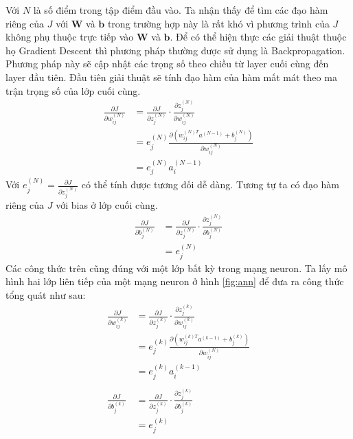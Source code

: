 Với $N$ là số điểm trong tập điểm đầu vào. Ta nhận thấy để tìm các đạo hàm riêng của $J$ với ${\boldsymbol{W}}$ và ${\boldsymbol{b}}$ trong trường hợp này là rất khó vì phương trình của $J$ không phụ thuộc trực tiếp vào ${\boldsymbol{W}}$ và ${\boldsymbol{b}}$. Để có thể hiện thực các giải thuật thuộc họ Gradient Descent thì phương pháp thường được sử dụng là Backpropagation. Phương pháp này sẽ cập nhật các trọng số theo chiều từ layer cuối cùng đến layer đầu tiên. Đầu tiên giải thuật sẽ tính đạo hàm của hàm mất mát theo ma trận trọng số của lớp cuối cùng.
\begin{align*}
	\frac
		{ {\partial} J }
		{ {\partial} {w_{ij}^{(N)}} }
	&=
	\frac
		{ {\partial} J }
		{ {\partial} {z_{j}^{(N)}} }
	{\cdot}
	\frac
		{ {\partial} {z_{j}^{(N)}} }
		{ {\partial} {w_{ij}^{(N)}} } \\
	&=
	{e_{j}^{(N)}}
	{
		\frac
			{ {\partial} \left(
							{w_{ij}^{(N)T}}
							a^{(N-1)}
							+
							{b_{j}^{(N)}}
						 \right)
			}
			{ {\partial} {w_{ij}^{(N)}} }
	}\\
	&={e_{j}^{(N)}}{a_{i}^{(N-1)}}
\end{align*}
Với ${e_{j}^{(N)}}=\frac{{\partial}J}{{\partial}{z_{j}^{(N)}}}$ có thể tính được tương đối dễ dàng. Tương tự ta có đạo hàm riêng của $J$ với bias ở lớp cuối cùng.
\begin{align*}
	\frac
		{ {\partial} J }
		{ {\partial} {b_{j}^{(N)}} }
	&=
	\frac
		{ {\partial} J }
		{ {\partial} {z_{j}^{(N)}} }
	{\cdot}
	\frac
		{ {\partial} {z_{j}^{(N)}} }
		{ {\partial} {b_{j}^{(N)}} } \\
	&={e_{j}^{(N)}}
\end{align*}
Các công thức trên cũng đúng với một lớp bất kỳ trong mạng neuron. Ta lấy mô hình hai lớp liên tiếp của một mạng neuron ở hình \ref{fig:ann} để đưa ra công thức tổng quát như sau:
\begin{align*}
	\frac
		{ {\partial} J }
		{ {\partial} {w_{ij}^{(k)}} }
	&=
	\frac
		{ {\partial} J }
		{ {\partial} {z_{j}^{(k)}} }
	{\cdot}
	\frac
		{ {\partial} {z_{j}^{(k)}} }
		{ {\partial} {w_{ij}^{(k)}} } \\
	&=
	{e_{j}^{(k)}}
	\frac
		{ {\partial} \left(
						{w_{ij}^{(k)T}}
						a^{(k-1)}
						+
						{b_{j}^{(k)}}
					 \right)
		}
		{ {\partial} {w_{ij}^{(N)}} } \\
	&={e_{j}^{(k)}}{a_{i}^{(k-1)}} \\ \\
	\frac
		{ {\partial} J }
		{ {\partial} {b_{j}^{(k)}} }
	&=
	\frac
		{ {\partial} J }
		{ {\partial} {z_{j}^{(k)}} }
	{\cdot}
	\frac
		{ {\partial} {z_{j}^{(k)}} }
		{ {\partial} {b_{j}^{(k)}} } \\
	&={e_{j}^{(k)}}
\end{align*}
